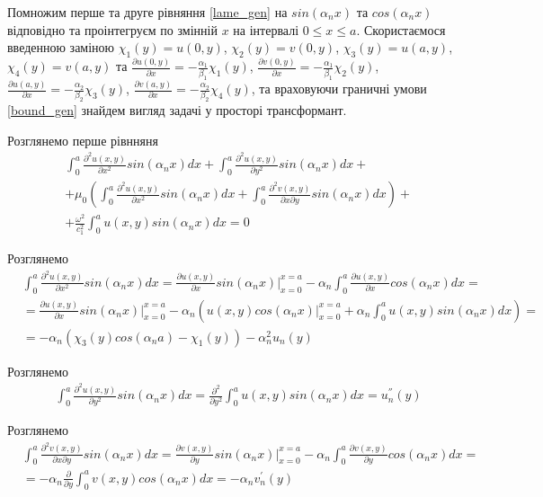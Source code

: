 Помножим перше та друге рівняння \eqref{lame_gen} на $sin(\alpha_n x)$ та $cos(\alpha_n x)$ відповідно та проінтегруєм по змінній $x$ на інтервалі $0 \le x \le a$.
Скористаємося введенною заміною $\chi_1(y) = u(0, y)$, $\chi_2(y) = v(0, y)$, $\chi_3(y) = u(a, y)$, $\chi_4(y) = v(a, y)$ та 
$\frac{\partial u(0, y)}{\partial x}=-\frac{\alpha_1}{\beta_1} \chi_1(y)$,
$\frac{\partial v(0, y)}{\partial x}=-\frac{\alpha_1}{\beta_1} \chi_2(y)$,
$\frac{\partial u(a, y)}{\partial x}=-\frac{\alpha_2}{\beta_2} \chi_3(y)$,
$\frac{\partial v(a, y)}{\partial x}=-\frac{\alpha_2}{\beta_2} \chi_4(y)$,
та враховуючи граничні умови \eqref{bound_gen} знайдем вигляд задачі у просторі трансформант.
\newline

Розглянемо перше рівнняня
\begin{align*}
    &\int_{0}^{a} \frac{\partial^2 u(x,y)}{\partial x^2} sin(\alpha_n x)dx + \int_{0}^{a} \frac{\partial^2 u(x,y)}{\partial y^2} sin(\alpha_n x)dx + \\ 
    & + \mu_0 \left( \int_{0}^{a} \frac{\partial^2 u(x,y)}{\partial x^2} sin(\alpha_n x)dx +  \int_{0}^{a} \frac{\partial^2 v(x,y)}{\partial x \partial y} sin(\alpha_n x) dx\right) + \\
    & + \frac{\omega^2}{c_1^2} \int_{0}^{a} u(x,y) sin(\alpha_n x)dx = 0
\end{align*}

Розглянемо
\begin{align*}
    &\int_{0}^{a} \frac{\partial^2 u(x,y)}{\partial x^2} sin(\alpha_n x)dx = \frac{\partial u(x,y)}{\partial x} sin(\alpha_n x) |_{x=0}^{x=a} - \alpha_n \int_{0}^{a} \frac{\partial u(x,y)}{\partial x} cos(\alpha_n x)dx = \\
    &= \frac{\partial u(x,y)}{\partial x} sin(\alpha_n x) |_{x=0}^{x=a} - \alpha_n \left( u(x,y) cos(\alpha_n x) |_{x=0}^{x=a} + \alpha_n \int_{0}^{a} u(x,y) sin(\alpha_n x) dx \right) = \\
    &=-\alpha_n(\chi_3(y) cos(\alpha_n a) - \chi_1(y)) -\alpha_n^2 u_n(y)
\end{align*}

Розглянемо
\begin{align*}
    &\int_{0}^{a} \frac{\partial^2 u(x,y)}{\partial y^2} sin(\alpha_n x)dx = \frac{\partial^2}{\partial y^2} \int_{0}^{a} u(x,y) sin(\alpha_n x)dx = u_n^{''}(y)
\end{align*}

Розглянемо
\begin{align*}
    &\int_{0}^{a} \frac{\partial^2 v(x,y)}{\partial x \partial y} sin(\alpha_n x) dx = \frac{\partial v(x,y)}{\partial y} sin(\alpha_n x) |_{x=0}^{x=a} - \alpha_n \int_{0}^{a} \frac{\partial v(x,y)}{\partial y} cos(\alpha_n x) dx = \\
    &= -\alpha_n \frac{\partial}{\partial y} \int_{0}^{a} v(x,y) cos(\alpha_n x) dx = -\alpha_n v_n^{'}(y)
\end{align*}


